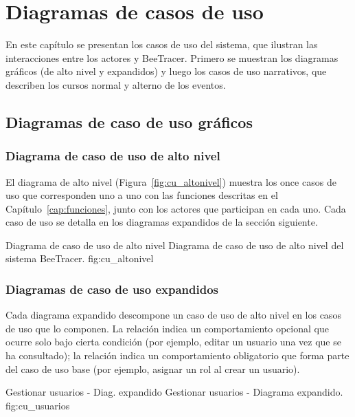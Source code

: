 \chapter{Diagramas de casos de uso}
\label{cap:casosuso}

En este capítulo se presentan los casos de uso del sistema, que ilustran las interacciones entre
los actores y BeeTracer. Primero se muestran los diagramas gráficos (de alto nivel y expandidos) y
luego los casos de uso narrativos, que describen los cursos normal y alterno de los eventos.

\section{Diagramas de caso de uso gráficos}
\label{sec:cu_graficos}

\subsection{Diagrama de caso de uso de alto nivel}
\label{subsec:cu_altonivel}

El diagrama de alto nivel (Figura~\ref{fig:cu_altonivel}) muestra los once casos de uso que
corresponden uno a uno con las funciones descritas en el Capítulo~\ref{cap:funciones}, junto con
los actores que participan en cada uno. Cada caso de uso se detalla en los diagramas expandidos de
la sección siguiente.

{Diagrama de caso de uso de alto nivel}
{Diagrama de caso de uso de alto nivel del sistema BeeTracer.}
{fig:cu_altonivel}

\subsection{Diagramas de caso de uso expandidos}
\label{subsec:cu_expandidos}

Cada diagrama expandido descompone un caso de uso de alto nivel en los casos de uso que lo
componen. La relación  indica un comportamiento opcional que ocurre solo bajo cierta
condición (por ejemplo, editar un usuario una vez que se ha consultado); la relación
 indica un comportamiento obligatorio que forma parte del caso de uso base (por
ejemplo, asignar un rol al crear un usuario).

{Gestionar usuarios - Diag. expandido}
{Gestionar usuarios - Diagrama expandido.}
{fig:cu_usuarios}


